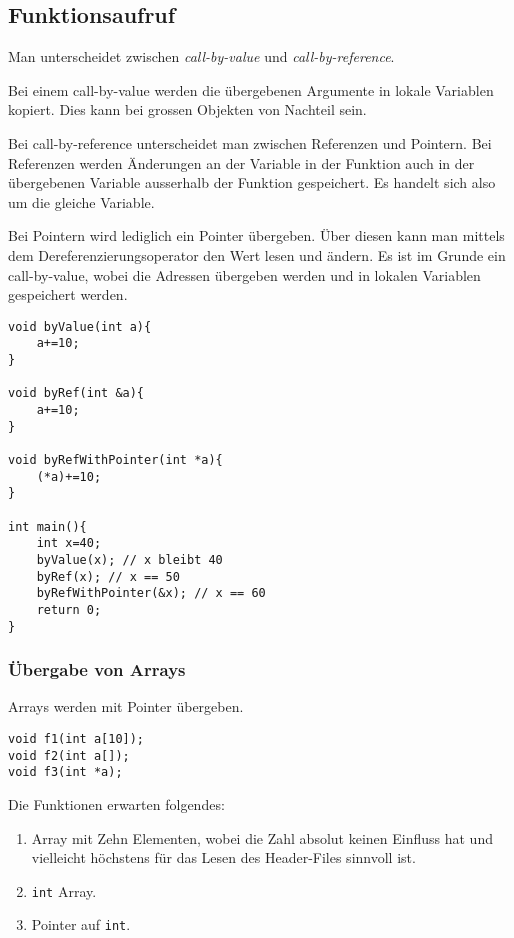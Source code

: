 \documentclass{article}
\newenvironment{code}
	{\begin{shaded}\vspace{-2.2mm}} 
	{\vspace{-5.0mm}\end{shaded}}
\begin{document}
\begin{multicols*}{3}
		\subsection{Funktionsaufruf} %
			Man unterscheidet zwischen \emph{call-by-value} und \emph{call-by-reference}.
			
			Bei einem call-by-value werden die übergebenen Argumente in lokale Variablen kopiert. Dies kann bei grossen Objekten von Nachteil sein.
			
			Bei call-by-reference unterscheidet man zwischen Referenzen und Pointern.
			Bei Referenzen werden Änderungen an der Variable in der Funktion auch in der übergebenen Variable ausserhalb der Funktion gespeichert. Es handelt sich also um die gleiche Variable.
			
			Bei Pointern wird lediglich ein Pointer übergeben. Über diesen kann man mittels dem Dereferenzierungsoperator den Wert lesen und ändern. Es ist im Grunde ein call-by-value, wobei die Adressen übergeben werden und in lokalen Variablen gespeichert werden.
			
			\begin{code}
				\begin{lstlisting}[style=list]
void byValue(int a){
	a+=10;
}

void byRef(int &a){
	a+=10;
}

void byRefWithPointer(int *a){
	(*a)+=10;
}

int main(){
	int x=40;
	byValue(x); // x bleibt 40
	byRef(x); // x == 50
	byRefWithPointer(&x); // x == 60
	return 0;
}
				\end{lstlisting}
			\end{code}
			
			\subsubsection{Übergabe von Arrays} %
				Arrays werden mit Pointer übergeben.
				\begin{code}
					\begin{lstlisting}[style=list]
void f1(int a[10]);
void f2(int a[]);
void f3(int *a);
					\end{lstlisting}
				\end{code}
				
				Die Funktionen erwarten folgendes:
				\begin{enumerate}
					\item Array mit Zehn Elementen, wobei die Zahl absolut keinen Einfluss hat und vielleicht höchstens für das Lesen des Header-Files sinnvoll ist.
					\item \lstinline!int! Array.
					\item Pointer auf \lstinline!int!.
				\end{enumerate}
				

\end{multicols*}
\end{document}
